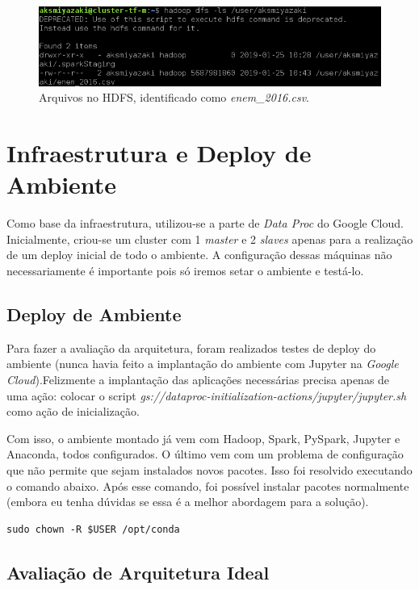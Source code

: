 \documentclass{article}
\begin{document}
\begin{figure}[H]
  \includegraphics[width=\linewidth]{img/file_hdfs.png}
  \caption{Arquivos no HDFS, identificado como \emph{enem\_2016.csv}.}
  \label{fig:data_on_hdfs}
\end{figure}

\newpage
\section{Infraestrutura e Deploy de Ambiente}

Como base da infraestrutura, utilizou-se a parte de \emph{Data Proc} do Google Cloud. Inicialmente, criou-se um cluster com 1 \emph{master} e 2 \emph{slaves} apenas para a realização de um deploy inicial de todo o ambiente. A configuração dessas máquinas não necessariamente é importante pois só iremos setar o ambiente e testá-lo.

\subsection{Deploy de Ambiente}

Para fazer a avaliação da arquitetura, foram realizados testes de deploy do ambiente (nunca havia feito a implantação do ambiente com Jupyter na \emph{Google Cloud}).Felizmente a implantação das aplicações necessárias precisa apenas de uma ação: colocar o script \emph{gs://dataproc-initialization-actions/jupyter/jupyter.sh} como ação de inicialização.

Com isso, o ambiente montado já vem com Hadoop, Spark, PySpark, Jupyter e Anaconda, todos configurados. O último vem com um problema de configuração que não permite que sejam instalados novos pacotes. Isso foi resolvido executando o comando abaixo. Após esse comando, foi possível instalar pacotes normalmente (embora eu tenha dúvidas se essa é a melhor abordagem para a solução).

\begin{lstlisting}[caption= {Solução de problema de Permissão.},captionpos=b]
sudo chown -R $USER /opt/conda
\end{lstlisting}

\subsection{Avaliação de Arquitetura Ideal}
\end{document}
